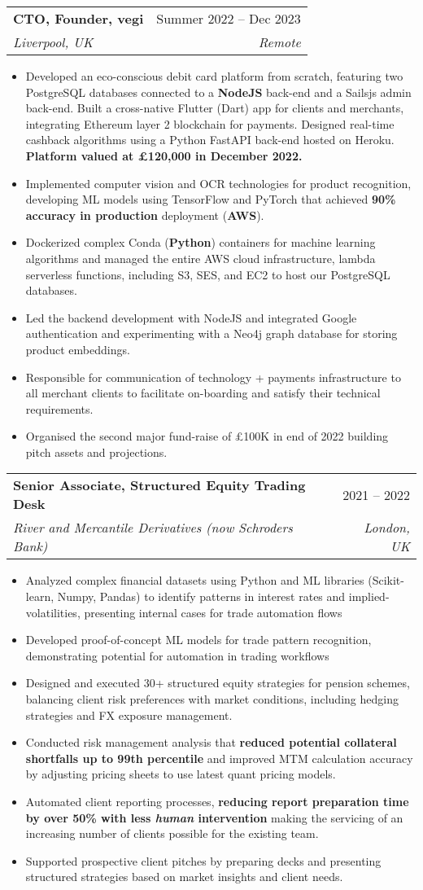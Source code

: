 \documentclass[a4paper,11pt]{article}
\makeatletter
\newcommand{\resumeItem}[1]{
  \item\small{#1}
}
\newcommand{\resumeItemListStart}{\begin{itemize}[rightmargin=0.11in]}
\newcommand{\resumeItemListEnd}{\end{itemize}}
\newcommand{\resumeQuadHeading}[4]{
  \item
  \begin{tabular*}{0.96\textwidth}[t]{l@{\extracolsep{\fill}}r}
    \textbf{#1} & #2 \\
    \textit{\small#3} & \textit{\small #4} \\
  \end{tabular*}
}
\makeatother
\begin{document}
  \resumeQuadHeading{CTO, Founder, vegi}{Summer 2022 -- Dec 2023}
  {Liverpool, UK}{Remote}
    \resumeItemListStart{}
\resumeItem{Developed an eco-conscious debit card platform from scratch, featuring two PostgreSQL databases connected to a \textbf{NodeJS} back-end and a Sailsjs admin back-end. Built a cross-native Flutter (Dart) app for clients and merchants, integrating Ethereum layer 2 blockchain for payments. Designed real-time cashback algorithms using a Python FastAPI back-end hosted on Heroku. \textbf{Platform valued at £120,000 in December 2022.}}
\resumeItem{Implemented computer vision and OCR technologies for product recognition, developing ML models using TensorFlow and PyTorch\label{pytorch} that achieved \textbf{90\% accuracy in production} deployment (\textbf{AWS})\label{cloud_compute}.
}
\resumeItem{Dockerized complex Conda (\textbf{Python}) containers for machine learning algorithms and managed the entire AWS cloud infrastructure, lambda serverless functions, including S3, SES, and EC2 to host our PostgreSQL databases.}
\resumeItem{Led the backend development with NodeJS and integrated Google authentication and experimenting with a Neo4j graph database for storing product embeddings.}
\resumeItem{Responsible for communication of technology + payments infrastructure to all merchant clients to facilitate on-boarding and satisfy their technical requirements.}
\resumeItem{Organised the second major fund-raise of £100K in end of 2022 building pitch assets and projections.}
\resumeItemListEnd{}

\resumeQuadHeading{Senior Associate, Structured Equity Trading Desk}{2021 -- 2022}
  {River and Mercantile Derivatives (now Schroders Bank)}{London, UK}
    \resumeItemListStart{}
      \resumeItem{Analyzed complex financial datasets using Python and ML libraries (Scikit-learn, Numpy, Pandas) to identify patterns in interest rates and implied-volatilities, presenting internal cases for trade automation flows}
      \resumeItem{Developed proof-of-concept ML models for trade pattern recognition, demonstrating potential for automation in trading workflows}
      \resumeItem{Designed and executed 30+ structured equity strategies for pension schemes, balancing client risk preferences with market conditions, including hedging strategies and FX exposure management.}
      \resumeItem{Conducted risk management analysis that \textbf{reduced potential collateral shortfalls up to 99th percentile }and improved MTM calculation accuracy by adjusting pricing sheets to use latest quant pricing models.}
      \resumeItem{Automated client reporting processes, \textbf{reducing report preparation time by over 50\% with less \textit{human} intervention} making the servicing of an increasing number of clients possible for the existing team.}
      \resumeItem{Supported prospective client pitches by preparing decks and presenting structured strategies based on market insights and client needs.}
    \resumeItemListEnd{}
\end{document}

